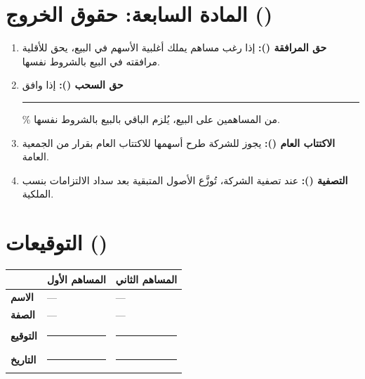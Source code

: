 \documentclass[12pt,a4paper]{article}
\begin{document}
\section{المادة السابعة: حقوق الخروج ()}
\label{sec:exit}
\begin{enumerate}
    \item \textbf{حق المرافقة ():} إذا رغب مساهم يملك أغلبية الأسهم في البيع، يحق للأقلية مرافقته في البيع بالشروط نفسها.
    \item \textbf{حق السحب ():} إذا وافق \rule{2cm}{0.4pt}\% من المساهمين على البيع، يُلزم الباقي بالبيع بالشروط نفسها.
    \item \textbf{الاكتتاب العام ():} يجوز للشركة طرح أسهمها للاكتتاب العام بقرار من الجمعية العامة.
    \item \textbf{التصفية ():} عند تصفية الشركة، تُوزَّع الأصول المتبقية بعد سداد الالتزامات بنسب الملكية.
\end{enumerate}

\vspace{2em}
\section*{التوقيعات ()}

\begin{table}[H]
\centering
\renewcommand{\arraystretch}{2.5}
\begin{tabularx}{\textwidth}{L{5cm} X X}
\toprule
& \textbf{المساهم الأول} & \textbf{المساهم الثاني} \\
\midrule
\textbf{الاسم} & --- & --- \\
\textbf{الصفة} & --- & --- \\
\textbf{التوقيع} & \rule{4cm}{0.4pt} & \rule{4cm}{0.4pt} \\
\textbf{التاريخ} & \rule{4cm}{0.4pt} & \rule{4cm}{0.4pt} \\
\bottomrule
\end{tabularx}
\end{table}
\end{document}
